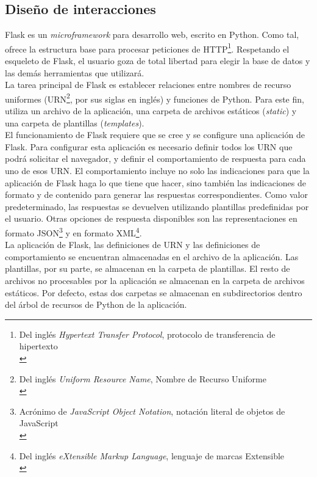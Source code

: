 \documentclass[a4paper,12pt]{article}
\begin{document}
\subsection{Diseño de interacciones}
\label{sec:orgheadline16}

Flask es un \emph{microframework} para desarrollo web, escrito en Python. Como tal, ofrece la estructura base para procesar peticiones de HTTP\footnote{Del inglés \emph{Hypertext Transfer Protocol}, protocolo de transferencia de hipertexto\\}. Respetando el esqueleto de Flask, el usuario goza de total libertad para elegir la base de datos y las demás herramientas que utilizará.\\

La tarea principal de Flask es establecer relaciones entre nombres de recurso uniformes (URN\footnote{Del inglés \emph{Uniform Resource Name}, Nombre de Recurso Uniforme\\}, por sus siglas en inglés) y funciones de Python. Para este fin, utiliza un archivo de la aplicación, una carpeta de archivos estáticos (\emph{static}) y una carpeta de plantillas (\emph{templates}).\\

El funcionamiento de Flask requiere que se cree y se configure una aplicación de Flask. Para configurar esta aplicación es necesario definir todos los URN que podrá solicitar el navegador, y definir el comportamiento de respuesta para cada uno de esos URN. El comportamiento incluye no solo las indicaciones para que la aplicación de Flask haga lo que tiene que hacer, sino también las indicaciones de formato y de contenido para generar las respuestas correspondientes. Como valor predeterminado, las respuestas se devuelven utilizando plantillas predefinidas por el usuario. Otras opciones de respuesta disponibles son las representaciones en formato JSON\footnote{Acrónimo de \emph{JavaScript Object Notation}, notación literal de objetos de JavaScript\\} y en formato XML\footnote{Del inglés \emph{eXtensible Markup Language}, lenguaje de marcas Extensible\\}.\\

La aplicación de Flask, las definiciones de URN y las definiciones de comportamiento se encuentran almacenadas en el archivo de la aplicación. Las plantillas, por su parte, se almacenan en la carpeta de plantillas. El resto de archivos no procesables por la aplicación se almacenan en la carpeta de archivos estáticos. Por defecto, estas dos carpetas se almacenan en subdirectorios dentro del árbol de recursos de Python de la aplicación.\\
\end{document}
